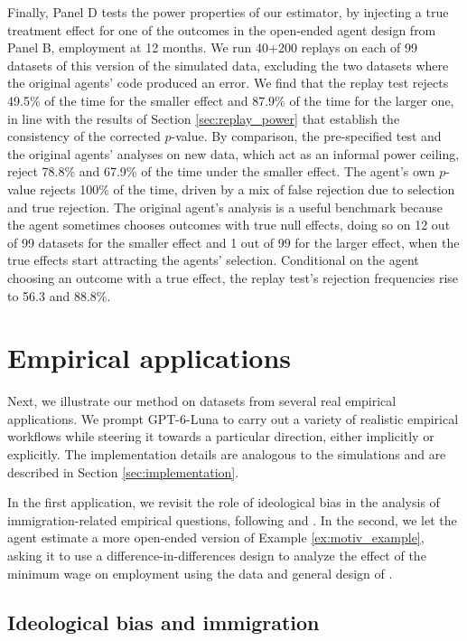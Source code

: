 \documentclass[10pt]{article}
\begin{document}
Finally, Panel D tests the power properties of our estimator, by injecting a true treatment effect for one of the outcomes in the open-ended agent design from Panel B, employment at 12 months. We run 40+200 replays on each of 99 datasets of this version of the simulated data, excluding the two datasets where the original agents' code produced an error. We find that the replay test rejects 49.5\% of the time for the smaller effect and 87.9\% of the time for the larger one, in line with the results of Section \ref{sec:replay_power} that establish the consistency of the corrected $p$-value. By comparison, the pre-specified test and the original agents' analyses on new data, which act as an informal power ceiling, reject 78.8\% and 67.9\% of the time under the smaller effect. The agent's own $p$-value rejects 100\% of the time, driven by a mix of false rejection due to selection and true rejection. The original agent's analysis is a useful benchmark because the agent sometimes chooses outcomes with true null effects, doing so on 12 out of 99 datasets for the smaller effect and 1 out of 99 for the larger effect, when the true effects start attracting the agents' selection. Conditional on the agent choosing an outcome with a true effect, the replay test's rejection frequencies rise to 56.3 and 88.8\%.

\FloatBarrier

\section{Empirical applications}\label{sec:empirical_results}

Next, we illustrate our method on datasets from several real empirical applications. We prompt GPT-6-Luna to carry out a variety of realistic empirical workflows while steering it towards a particular direction, either implicitly or explicitly. The implementation details are analogous to the simulations and are described in Section \ref{sec:implementation}.

In the first application, we revisit the role of ideological bias in the analysis of immigration-related empirical questions, following \citet{miao2026agentic} and \citet{borjas2026ideological}. In the second, we let the agent estimate a more open-ended version of Example \ref{ex:motiv_example}, asking it to use a difference-in-differences design to analyze the effect of the minimum wage on employment using the data and general design of \citet{card1994minimum}.

\subsection{Ideological bias and immigration}
\end{document}
